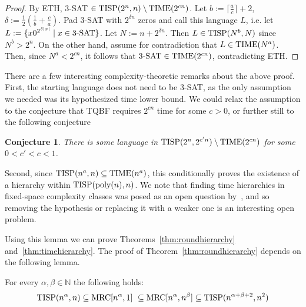\documentclass[letterpaper,USenglish]{lipics}
\newtheorem{conjecture}{Conjecture}
\theoremstyle{definition}
\theoremstyle{remark}
\newcommand{\mrc}{\textup{MRC}}
\newcommand{\TIME}{\textup{TIME}}
\newcommand{\TISP}{\textup{TISP}}
\begin{document}
\begin{proof}
By ETH, 3-SAT $\in \TISP(2^n, n)\setminus \TIME(2^{cn})$. Let
$b:=\lceil\frac{a}{c}\rceil+2$, $\delta:=\frac12(\frac1b+\frac{c}{a})$. Pad
3-SAT with $2^{\delta n}$ zeros and call this language $L$, i.e. let $L:=\{x
0^{2^{\delta|x|}} \mid x \in \textup{3-SAT}\}$. Let $N:=n+2^{\delta n}$. Then
$L\in \TISP(N^b, N)$ since $N^b > 2^n$. On the other hand, assume for
contradiction that $L \in \TIME(N^a)$. Then, since $N^a < 2^{cn}$, it follows
that $\textup{3-SAT} \in \TIME(2^{cn})$, contradicting ETH.
\end{proof}

There are a few interesting complexity-theoretic remarks about the above proof.
First, the starting language does not need to be 3-SAT, as the only assumption
we needed was its hypothesized time lower bound.  We could relax the assumption
to the conjecture that TQBF requires $2^{cn}$ time for some $c > 0$, or further
still to the following conjecture

\begin{conjecture} \label{conj:weaketh}
There is some language in $\TISP(2^n, 2^{c'n}) \setminus \TIME(2^{cn})$ for
some $0 < c' < c < 1$.
\end{conjecture}

Second, since $\TISP(n^a, n) \subseteq \TIME(n^a)$, this conditionally proves the
existence of a hierarchy within $\TISP(\textup{poly}(n), n)$. We note that
finding time hierarchies in fixed-space complexity classes was posed as an open
question by~\cite{WagnerW86}, and so removing the hypothesis or replacing it
with a weaker one is an interesting open problem.

Using this lemma we can prove Theorems~\ref{thm:roundhierarchy}
and~\ref{thm:timehierarchy}. The proof of Theorem~\ref{thm:roundhierarchy}
depends on the following lemma.

\begin{lemma} \label{lem:tisprelation}
For every $\alpha, \beta \in \mathbb N$ the following holds: $$ \TISP(n^\alpha,
n)  \subseteq \mrc[n^\alpha, 1] \ \subseteq \mrc[n^\alpha, n^\beta] \subseteq
\TISP(n^{\alpha+\beta+2}, n^2) $$
\end{lemma}
\end{document}
